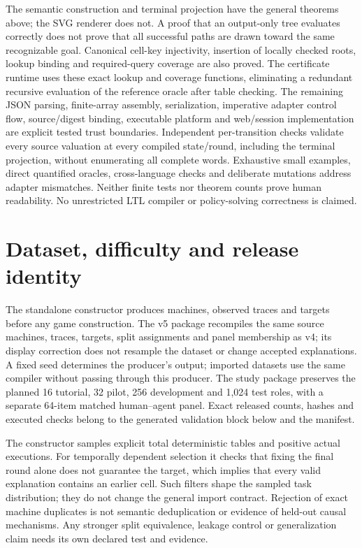 \documentclass[11pt]{article}
\begin{document}
The semantic construction and terminal projection have the general theorems
above; the SVG renderer does not. A proof that an output-only tree evaluates
correctly does not prove that all successful paths are drawn toward the same
recognizable goal. Canonical cell-key injectivity, insertion of locally checked roots,
lookup binding and required-query coverage are also proved. The certificate
runtime uses these exact lookup and coverage functions, eliminating a redundant
recursive evaluation of the reference oracle after table checking. The remaining
JSON parsing, finite-array assembly, serialization, imperative adapter control
flow, source/digest binding, executable platform and web/session implementation
are explicit tested trust boundaries. Independent per-transition checks validate
every source valuation at every compiled state/round, including the terminal
projection, without enumerating all complete words. Exhaustive small examples, direct quantified oracles,
cross-language checks and deliberate mutations address adapter mismatches.
Neither finite tests nor theorem counts prove human readability. No unrestricted
LTL compiler or policy-solving correctness is claimed.

\section{Dataset, difficulty and release identity}
The standalone constructor produces machines, observed traces and targets before any
game construction. The v5 package recompiles the same source machines, traces,
targets, split assignments and panel membership as v4; its display correction
does not resample the dataset or change accepted explanations. A fixed seed
determines the producer's output; imported datasets use the
same compiler without passing through this producer. The study package preserves
the planned 16 tutorial, 32 pilot, 256 development and 1,024 test roles, with a
separate 64-item matched human--agent panel. Exact released counts, hashes and
executed checks belong to the generated validation block below and the manifest.

The constructor samples explicit total deterministic tables and positive actual
executions. For temporally dependent selection it checks that fixing the final
round alone does not guarantee the target, which implies that every valid
explanation contains an earlier cell. Such filters shape the sampled task
distribution; they do not change the general import contract. Rejection of exact
machine duplicates is not semantic deduplication or evidence of held-out causal
mechanisms. Any stronger split equivalence, leakage control or generalization
claim needs its own declared test and evidence.
\end{document}
